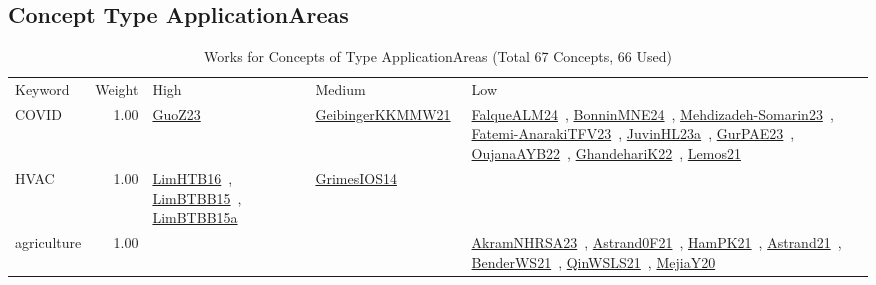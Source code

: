 \subsection{Concept Type ApplicationAreas}
\label{sec:ApplicationAreas}
\label{ApplicationAreas}
{\scriptsize
\begin{longtable}{p{3cm}r>{\raggedright\arraybackslash}p{6cm}>{\raggedright\arraybackslash}p{6cm}>{\raggedright\arraybackslash}p{8cm}}
\rowcolor{white}\caption{Works for Concepts of Type ApplicationAreas (Total 67 Concepts, 66 Used)}\\ \toprule
\rowcolor{white}Keyword & Weight & High & Medium & Low\\ \midrule\endhead
\bottomrule
\endfoot
\index{COVID}\index{ApplicationAreas!COVID}COVID &  1.00 & \href{../works/GuoZ23.pdf}{GuoZ23}~\cite{GuoZ23} & \href{../works/GeibingerKKMMW21.pdf}{GeibingerKKMMW21}~\cite{GeibingerKKMMW21} & \href{../works/FalqueALM24.pdf}{FalqueALM24}~\cite{FalqueALM24}, \href{../works/BonninMNE24.pdf}{BonninMNE24}~\cite{BonninMNE24}, \href{../works/Mehdizadeh-Somarin23.pdf}{Mehdizadeh-Somarin23}~\cite{Mehdizadeh-Somarin23}, \href{../works/Fatemi-AnarakiTFV23.pdf}{Fatemi-AnarakiTFV23}~\cite{Fatemi-AnarakiTFV23}, \href{../works/JuvinHL23a.pdf}{JuvinHL23a}~\cite{JuvinHL23a}, \href{../works/GurPAE23.pdf}{GurPAE23}~\cite{GurPAE23}, \href{../works/OujanaAYB22.pdf}{OujanaAYB22}~\cite{OujanaAYB22}, \href{../works/GhandehariK22.pdf}{GhandehariK22}~\cite{GhandehariK22}, \href{../works/Lemos21.pdf}{Lemos21}~\cite{Lemos21}\\
\index{HVAC}\index{ApplicationAreas!HVAC}HVAC &  1.00 & \href{../works/LimHTB16.pdf}{LimHTB16}~\cite{LimHTB16}, \href{../works/LimBTBB15.pdf}{LimBTBB15}~\cite{LimBTBB15}, \href{../works/LimBTBB15a.pdf}{LimBTBB15a}~\cite{LimBTBB15a} & \href{../works/GrimesIOS14.pdf}{GrimesIOS14}~\cite{GrimesIOS14} & \\
\index{agriculture}\index{ApplicationAreas!agriculture}agriculture &  1.00 &  &  & \href{../works/AkramNHRSA23.pdf}{AkramNHRSA23}~\cite{AkramNHRSA23}, \href{../works/Astrand0F21.pdf}{Astrand0F21}~\cite{Astrand0F21}, \href{../works/HamPK21.pdf}{HamPK21}~\cite{HamPK21}, \href{../works/Astrand21.pdf}{Astrand21}~\cite{Astrand21}, \href{../works/BenderWS21.pdf}{BenderWS21}~\cite{BenderWS21}, \href{../works/QinWSLS21.pdf}{QinWSLS21}~\cite{QinWSLS21}, \href{../works/MejiaY20.pdf}{MejiaY20}~\cite{MejiaY20}\\

\end{longtable}}
